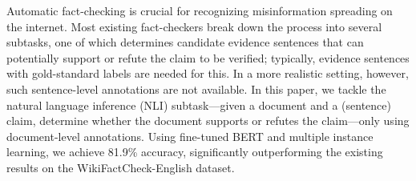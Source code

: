 Automatic fact-checking is crucial for recognizing misinformation spreading on the internet. Most existing fact-checkers break down the process into several subtasks, one of which determines candidate evidence sentences that can potentially support or refute the claim to be verified; typically, evidence sentences with gold-standard labels are needed for this. In a more realistic setting, however, such sentence-level annotations are not available. In this paper, we tackle the natural language inference (NLI) subtask---given a document and a (sentence) claim, determine whether the document supports or refutes the claim---only using document-level annotations. Using fine-tuned BERT and multiple instance learning, we achieve 81.9\% accuracy, significantly outperforming the existing results on the WikiFactCheck-English dataset.
